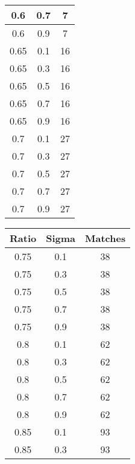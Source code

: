 \documentclass[12pt,letterpaper, onecolumn]{exam}
\begin{document}
\begin{questions}
\begin{solution}
\begin{center}
\begin{tabular}{|c|c|c|}
                \hline
                0.6 & 0.7 & 7 \\
                \hline
                0.6 & 0.9 & 7 \\
                \hline
                0.65 & 0.1 & 16 \\
                \hline
                0.65 & 0.3 & 16 \\
                \hline
                0.65 & 0.5 & 16 \\
                \hline
                0.65 & 0.7 & 16 \\
                \hline
                0.65 & 0.9 & 16 \\
                \hline
                0.7 & 0.1 & 27 \\
                \hline
                0.7 & 0.3 & 27 \\
                \hline
                0.7 & 0.5 & 27 \\
                \hline
                0.7 & 0.7 & 27 \\
                \hline
                0.7 & 0.9 & 27 \\
                \hline
            \end{tabular}
            \quad
            \begin{tabular}{|c|c|c|}
                \hline
                \textbf{Ratio} & \textbf{Sigma} & \textbf{Matches} \\
                \hline
                0.75 & 0.1 & 38 \\
                \hline
                0.75 & 0.3 & 38 \\
                \hline
                0.75 & 0.5 & 38 \\
                \hline
                0.75 & 0.7 & 38 \\
                \hline
                0.75 & 0.9 & 38 \\
                \hline
                0.8 & 0.1 & 62 \\
                \hline
                0.8 & 0.3 & 62 \\
                \hline
                0.8 & 0.5 & 62 \\
                \hline
                0.8 & 0.7 & 62 \\
                \hline
                0.8 & 0.9 & 62 \\
                \hline
                0.85 & 0.1 & 93 \\
                \hline
                0.85 & 0.3 & 93 \\

\end{tabular}
\end{center}
\end{solution}
\end{questions}
\end{document}

